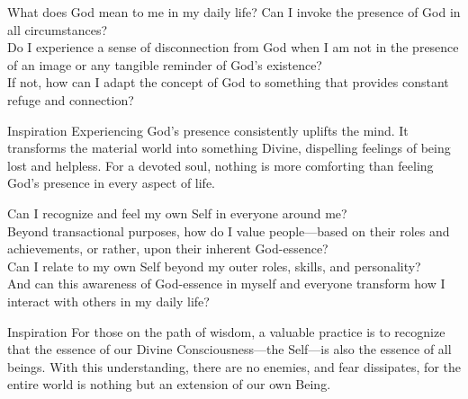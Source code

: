 



\newpage
\begin{mananam}{}
\mananamtext What does God mean to me in my daily life? Can I invoke the presence of God in all circumstances?\\
Do I experience a sense of disconnection from God when I am not in the presence of an image or any tangible reminder of God’s existence?\\
If not, how can I adapt the concept of God to something that provides constant refuge and connection?
\end{mananam}
\WritingHand{}
\begin{inspiration}{\mananamfont Inspiration}
\mananamtext Experiencing God’s presence consistently uplifts the mind. It transforms the material world into something Divine, dispelling feelings of being lost and helpless. For a devoted soul, nothing is more comforting than feeling God’s presence in every aspect of life.
\end{inspiration}
\newpage

\newpage
\begin{mananam}{}
\mananamtext Can I recognize and feel my own Self in everyone around me?\\
Beyond transactional purposes, how do I value people—based on their roles and achievements, or rather, upon their inherent God-essence?\\
Can I relate to my own Self beyond my outer roles, skills, and personality?\\
And can this awareness of God-essence in myself and everyone transform how I interact with others in my daily life?
\end{mananam}
\WritingHand{}
\begin{inspiration}{\mananamfont Inspiration}
\mananamtext For those on the path of wisdom, a valuable practice is to recognize that the essence of our Divine Consciousness—the Self—is also the essence of all beings. With this understanding, there are no enemies, and fear dissipates, for the entire world is nothing but an extension of our own Being.
\end{inspiration}
\newpage

